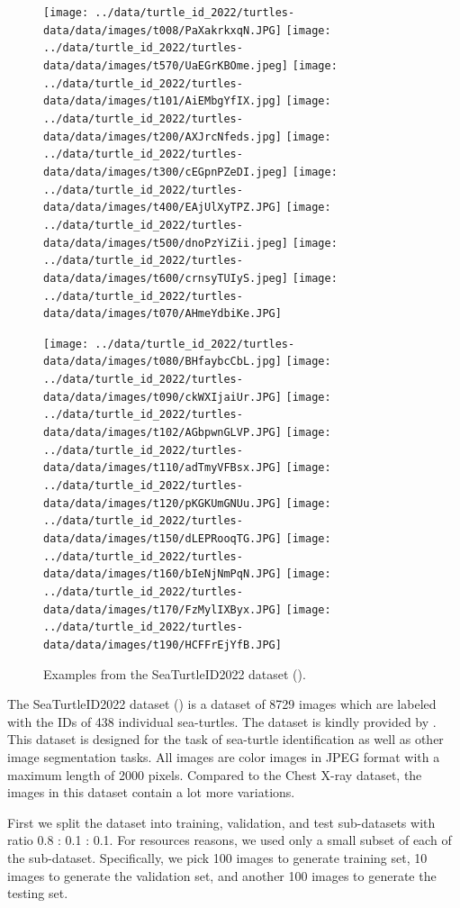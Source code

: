 \documentclass[12pt]{article}
\begin{document}
\begin{figure}[H]
    \centering
    \texttt{[image: ../data/turtle\_id\_2022/turtles-data/data/images/t008/PaXakrkxqN.JPG]}
    \texttt{[image: ../data/turtle\_id\_2022/turtles-data/data/images/t570/UaEGrKBOme.jpeg]}
    \texttt{[image: ../data/turtle\_id\_2022/turtles-data/data/images/t101/AiEMbgYfIX.jpg]}
    \texttt{[image: ../data/turtle\_id\_2022/turtles-data/data/images/t200/AXJrcNfeds.jpg]}
    \texttt{[image: ../data/turtle\_id\_2022/turtles-data/data/images/t300/cEGpnPZeDI.jpeg]}
    \texttt{[image: ../data/turtle\_id\_2022/turtles-data/data/images/t400/EAjUlXyTPZ.JPG]}
    \texttt{[image: ../data/turtle\_id\_2022/turtles-data/data/images/t500/dnoPzYiZii.jpeg]}
    \texttt{[image: ../data/turtle\_id\_2022/turtles-data/data/images/t600/crnsyTUIyS.jpeg]}
    \texttt{[image: ../data/turtle\_id\_2022/turtles-data/data/images/t070/AHmeYdbiKe.JPG]}

    \texttt{[image: ../data/turtle\_id\_2022/turtles-data/data/images/t080/BHfaybcCbL.jpg]}
    \texttt{[image: ../data/turtle\_id\_2022/turtles-data/data/images/t090/ckWXIjaiUr.JPG]}
    \texttt{[image: ../data/turtle\_id\_2022/turtles-data/data/images/t102/AGbpwnGLVP.JPG]}
    \texttt{[image: ../data/turtle\_id\_2022/turtles-data/data/images/t110/adTmyVFBsx.JPG]}
    \texttt{[image: ../data/turtle\_id\_2022/turtles-data/data/images/t120/pKGKUmGNUu.JPG]}
    \texttt{[image: ../data/turtle\_id\_2022/turtles-data/data/images/t150/dLEPRooqTG.JPG]}
    \texttt{[image: ../data/turtle\_id\_2022/turtles-data/data/images/t160/bIeNjNmPqN.JPG]}
    \texttt{[image: ../data/turtle\_id\_2022/turtles-data/data/images/t170/FzMylIXByx.JPG]}
    \texttt{[image: ../data/turtle\_id\_2022/turtles-data/data/images/t190/HCFFrEjYfB.JPG]}

    \caption{
        Examples from the SeaTurtleID2022 dataset (\cite{Adam_2024_WACV}).
    }
\end{figure}

The SeaTurtleID2022 dataset (\cite{Adam_2024_WACV}) is a dataset of 8729 images which are labeled with the IDs of 438 individual sea-turtles. The dataset is kindly provided by \cite{seaturtleid2022}.
This dataset is designed for the task of sea-turtle identification as well as other image segmentation tasks.
All images are color images in JPEG format with a maximum length of 2000 pixels.
Compared to the Chest X-ray dataset, the images in this dataset contain a lot more variations.

First we split the dataset into training, validation, and test sub-datasets with ratio 0.8 : 0.1 : 0.1.
For resources reasons, we used only a small subset of each of the sub-dataset.
Specifically, we pick 100 images to generate training set, 10 images to generate the validation set, and another 100 images to generate the testing set.
\end{document}
